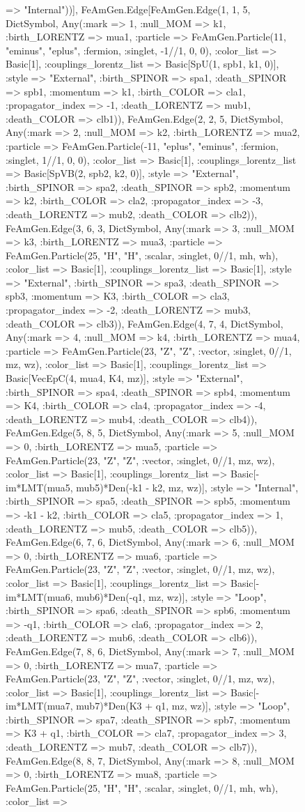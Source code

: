 \documentclass{revtex4}
\begin{document}
\begin{figure}[!htb]
\begin{center}
{=> "Internal"))], FeAmGen.Edge[FeAmGen.Edge(1, 1, 5, Dict{Symbol, Any}(:mark => 1, :null_MOM => k1, :birth_LORENTZ => mua1, :particle => FeAmGen.Particle(11, "eminus", "eplus", :fermion, :singlet, -1//1, 0, 0), :color_list => Basic[1], :couplings_lorentz_list => Basic[SpU(1, spb1, k1, 0)], :style => "External", :birth_SPINOR => spa1, :death_SPINOR => spb1, :momentum => k1, :birth_COLOR => cla1, :propagator_index => -1, :death_LORENTZ => mub1, :death_COLOR => clb1)), FeAmGen.Edge(2, 2, 5, Dict{Symbol, Any}(:mark => 2, :null_MOM => k2, :birth_LORENTZ => mua2, :particle => FeAmGen.Particle(-11, "eplus", "eminus", :fermion, :singlet, 1//1, 0, 0), :color_list => Basic[1], :couplings_lorentz_list => Basic[SpVB(2, spb2, k2, 0)], :style => "External", :birth_SPINOR => spa2, :death_SPINOR => spb2, :momentum => k2, :birth_COLOR => cla2, :propagator_index => -3, :death_LORENTZ => mub2, :death_COLOR => clb2)), FeAmGen.Edge(3, 6, 3, Dict{Symbol, Any}(:mark => 3, :null_MOM => k3, :birth_LORENTZ => mua3, :particle => FeAmGen.Particle(25, "H", "H", :scalar, :singlet, 0//1, mh, wh), :color_list => Basic[1], :couplings_lorentz_list => Basic[1], :style => "External", :birth_SPINOR => spa3, :death_SPINOR => spb3, :momentum => K3, :birth_COLOR => cla3, :propagator_index => -2, :death_LORENTZ => mub3, :death_COLOR => clb3)), FeAmGen.Edge(4, 7, 4, Dict{Symbol, Any}(:mark => 4, :null_MOM => k4, :birth_LORENTZ => mua4, :particle => FeAmGen.Particle(23, "Z", "Z", :vector, :singlet, 0//1, mz, wz), :color_list => Basic[1], :couplings_lorentz_list => Basic[VecEpC(4, mua4, K4, mz)], :style => "External", :birth_SPINOR => spa4, :death_SPINOR => spb4, :momentum => K4, :birth_COLOR => cla4, :propagator_index => -4, :death_LORENTZ => mub4, :death_COLOR => clb4)), FeAmGen.Edge(5, 8, 5, Dict{Symbol, Any}(:mark => 5, :null_MOM => 0, :birth_LORENTZ => mua5, :particle => FeAmGen.Particle(23, "Z", "Z", :vector, :singlet, 0//1, mz, wz), :color_list => Basic[1], :couplings_lorentz_list => Basic[-im*LMT(mua5, mub5)*Den(-k1 - k2, mz, wz)], :style => "Internal", :birth_SPINOR => spa5, :death_SPINOR => spb5, :momentum => -k1 - k2, :birth_COLOR => cla5, :propagator_index => 1, :death_LORENTZ => mub5, :death_COLOR => clb5)), FeAmGen.Edge(6, 7, 6, Dict{Symbol, Any}(:mark => 6, :null_MOM => 0, :birth_LORENTZ => mua6, :particle => FeAmGen.Particle(23, "Z", "Z", :vector, :singlet, 0//1, mz, wz), :color_list => Basic[1], :couplings_lorentz_list => Basic[-im*LMT(mua6, mub6)*Den(-q1, mz, wz)], :style => "Loop", :birth_SPINOR => spa6, :death_SPINOR => spb6, :momentum => -q1, :birth_COLOR => cla6, :propagator_index => 2, :death_LORENTZ => mub6, :death_COLOR => clb6)), FeAmGen.Edge(7, 8, 6, Dict{Symbol, Any}(:mark => 7, :null_MOM => 0, :birth_LORENTZ => mua7, :particle => FeAmGen.Particle(23, "Z", "Z", :vector, :singlet, 0//1, mz, wz), :color_list => Basic[1], :couplings_lorentz_list => Basic[-im*LMT(mua7, mub7)*Den(K3 + q1, mz, wz)], :style => "Loop", :birth_SPINOR => spa7, :death_SPINOR => spb7, :momentum => K3 + q1, :birth_COLOR => cla7, :propagator_index => 3, :death_LORENTZ => mub7, :death_COLOR => clb7)), FeAmGen.Edge(8, 8, 7, Dict{Symbol, Any}(:mark => 8, :null_MOM => 0, :birth_LORENTZ => mua8, :particle => FeAmGen.Particle(25, "H", "H", :scalar, :singlet, 0//1, mh, wh), :color_list => }
\end{center}
\end{figure}
\end{document}
